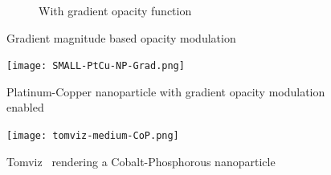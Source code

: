 \begin{figure}[ht]
\begin{subfigure}[b]{0.5\columnwidth}
    \caption{With gradient opacity function}
    \label{fig:Ng2}
  \end{subfigure}
  \caption{Gradient magnitude based opacity modulation}
  \label{fig:gradient}
\end{figure}

\begin{figure}[h]
  \centering
  \texttt{[image: SMALL-PtCu-NP-Grad.png]}
  \caption{Platinum-Copper nanoparticle with gradient opacity modulation enabled}
  \label{fig:ptcu-grad}
\end{figure}

\begin{figure}[h]
  \centering
  \texttt{[image: tomviz-medium-CoP.png]}
  \caption{Tomviz~\protect\cite{tomviz} rendering a Cobalt-Phosphorous
  nanoparticle}
  \label{fig:tomviz-cop}
\end{figure}
